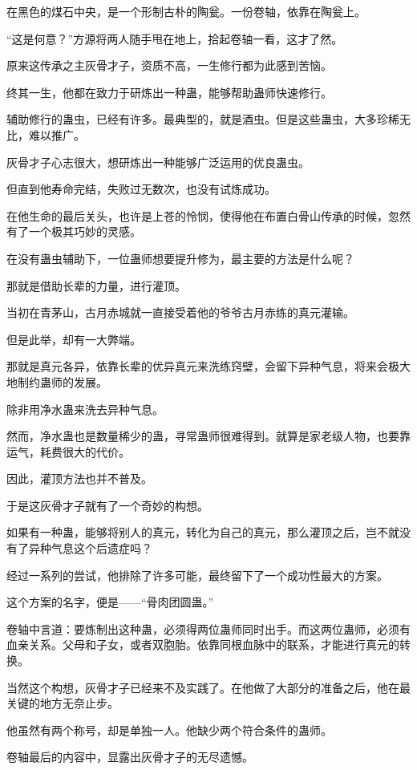 \begin{this_body}
在黑色的煤石中央，是一个形制古朴的陶瓮。一份卷轴，依靠在陶瓮上。

“这是何意？”方源将两人随手甩在地上，拾起卷轴一看，这才了然。

原来这传承之主灰骨才子，资质不高，一生修行都为此感到苦恼。

终其一生，他都在致力于研炼出一种蛊，能够帮助蛊师快速修行。

辅助修行的蛊虫，已经有许多。最典型的，就是酒虫。但是这些蛊虫，大多珍稀无比，难以推广。

灰骨才子心志很大，想研炼出一种能够广泛运用的优良蛊虫。

但直到他寿命完结，失败过无数次，也没有试炼成功。

在他生命的最后关头，也许是上苍的怜悯，使得他在布置白骨山传承的时候，忽然有了一个极其巧妙的灵感。

在没有蛊虫辅助下，一位蛊师想要提升修为，最主要的方法是什么呢？

那就是借助长辈的力量，进行灌顶。

当初在青茅山，古月赤城就一直接受着他的爷爷古月赤练的真元灌输。

但是此举，却有一大弊端。

那就是真元各异，依靠长辈的优异真元来洗练窍壁，会留下异种气息，将来会极大地制约蛊师的发展。

除非用净水蛊来洗去异种气息。

然而，净水蛊也是数量稀少的蛊，寻常蛊师很难得到。就算是家老级人物，也要靠运气，耗费很大的代价。

因此，灌顶方法也并不普及。

于是这灰骨才子就有了一个奇妙的构想。

如果有一种蛊，能够将别人的真元，转化为自己的真元，那么灌顶之后，岂不就没有了异种气息这个后遗症吗？

经过一系列的尝试，他排除了许多可能，最终留下了一个成功性最大的方案。

这个方案的名字，便是——“骨肉团圆蛊。”

卷轴中言道：要炼制出这种蛊，必须得两位蛊师同时出手。而这两位蛊师，必须有血亲关系。父母和子女，或者双胞胎。依靠同根血脉中的联系，才能进行真元的转换。

当然这个构想，灰骨才子已经来不及实践了。在他做了大部分的准备之后，他在最关键的地方无奈止步。

他虽然有两个称号，却是单独一人。他缺少两个符合条件的蛊师。

卷轴最后的内容中，显露出灰骨才子的无尽遗憾。


\end{this_body}
